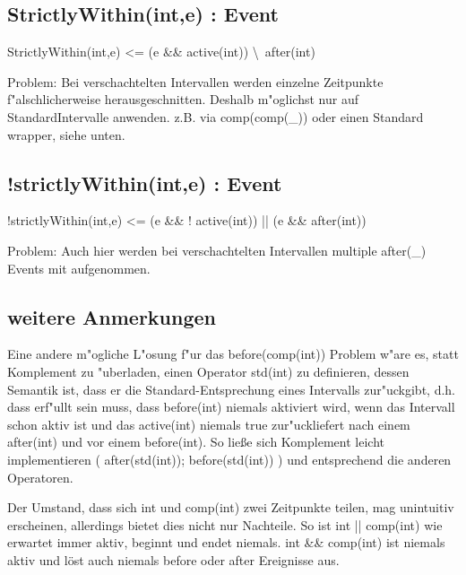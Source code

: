 \documentclass[article,colorback,accentcolor=tud4c]{tudreport}
\begin{document}
\subsection{ StrictlyWithin(int,e) : Event}
StrictlyWithin(int,e) <= (e \&\& active(int)) \textbackslash\ after(int)

Problem: Bei verschachtelten Intervallen werden einzelne Zeitpunkte f"alschlicherweise herausgeschnitten. Deshalb m"oglichst nur auf StandardIntervalle anwenden. z.B. via comp(comp(\_)) oder einen Standard wrapper, siehe unten.

\subsection{ !strictlyWithin(int,e) : Event }
!strictlyWithin(int,e) <= (e \&\& ! active(int)) || (e \&\& after(int))

Problem: Auch hier werden bei verschachtelten Intervallen multiple after(\_) Events mit aufgenommen.

\subsection{weitere Anmerkungen}
Eine andere m"ogliche L"osung f"ur das before(comp(int)) Problem w"are es, statt Komplement zu "uberladen, einen Operator std(int) zu definieren, dessen Semantik ist, dass er die Standard-Entsprechung eines Intervalls zur"uckgibt, d.h. dass erf"ullt sein muss, dass before(int) niemals aktiviert wird, wenn das Intervall schon aktiv ist und das active(int) niemals true zur"uckliefert nach einem after(int) und vor einem before(int). So lie\ss e sich Komplement leicht implementieren ( after(std(int)); before(std(int)) ) und entsprechend die anderen Operatoren.

Der Umstand, dass sich int und comp(int) zwei Zeitpunkte teilen, mag unintuitiv erscheinen, allerdings bietet dies nicht nur Nachteile. So ist int || comp(int) wie erwartet immer aktiv, beginnt und endet niemals. int \&\& comp(int) ist niemals aktiv und löst auch niemals before oder after Ereignisse aus.

  \listoffigures{}
\end{document}
